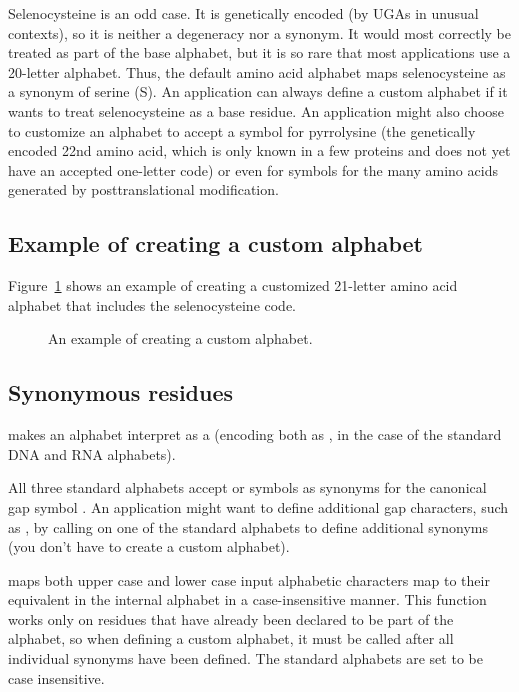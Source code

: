 Selenocysteine is an odd case. It is genetically encoded (by UGAs in
unusual contexts), so it is neither a degeneracy nor a synonym. It
would most correctly be treated as part of the base alphabet, but it
is so rare that most applications use a 20-letter alphabet.  Thus, the
default amino acid alphabet maps selenocysteine as a synonym of serine
(S). An application can always define a custom alphabet if it wants to
treat selenocysteine as a base residue. An application might also
choose to customize an alphabet to accept a symbol for pyrrolysine
(the genetically encoded 22nd amino acid, which is only known in a few
proteins and does not yet have an accepted one-letter code) or even
for symbols for the many amino acids generated by posttranslational
modification.


\subsection{Example of creating a custom alphabet}

Figure~\ref{fig:alphabet_example2} shows an example of creating a
customized 21-letter amino acid alphabet that includes the 
selenocysteine code.

\begin{figure}

\caption{An example of creating a custom alphabet.}
\label{fig:alphabet_example2}
\end{figure}

\subsection{Synonymous residues}

 makes an alphabet
interpret  as a  (encoding both as , in the
case of the standard DNA and RNA alphabets).
 
All three standard alphabets accept \ccode{\_} or   symbols
as synonyms for the canonical gap symbol \ccode{-}. An application
might want to define additional gap characters, such as \ccode{~}, by
calling  on one of the
standard alphabets to define additional synonyms (you don't have to
create a custom alphabet).

 maps both upper case and
lower case input alphabetic characters map to their equivalent in the
internal alphabet in a case-insensitive manner.  This function works
only on residues that have already been declared to be part of the
alphabet, so when defining a custom alphabet, it must be called after
all individual synonyms have been defined. The standard alphabets are
set to be case insensitive.

